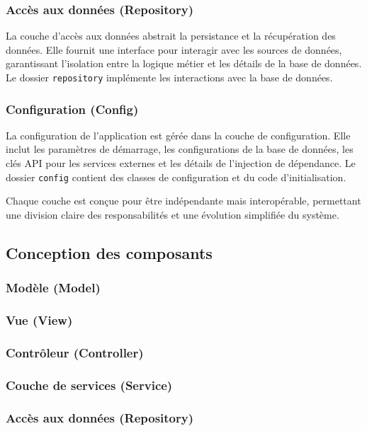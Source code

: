 \documentclass{article}
\begin{document}
\subsubsection{Accès aux données (Repository)}
La couche d'accès aux données abstrait la persistance et la récupération des données. Elle fournit une interface pour interagir avec les sources de données, garantissant l'isolation entre la logique métier et les détails de la base de données. Le dossier \texttt{repository} implémente les interactions avec la base de données.

\subsubsection{Configuration (Config)}
La configuration de l'application est gérée dans la couche de configuration. Elle inclut les paramètres de démarrage, les configurations de la base de données, les clés API pour les services externes et les détails de l'injection de dépendance. Le dossier \texttt{config} contient des classes de configuration et du code d'initialisation.

Chaque couche est conçue pour être indépendante mais interopérable, permettant une division claire des responsabilités et une évolution simplifiée du système.


\subsection{Conception des composants}

\subsubsection{Modèle (Model)}

\subsubsection{Vue (View)}

\subsubsection{Contrôleur (Controller)}

\subsubsection{Couche de services (Service)}

\subsubsection{Accès aux données (Repository)}
\end{document}
